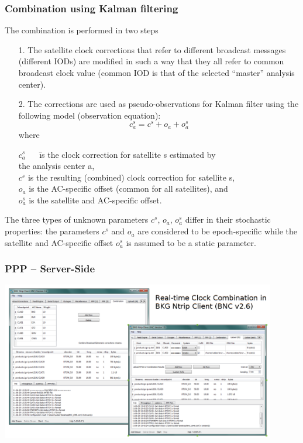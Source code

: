\documentclass[10pt]{beamer}
\begin{document}
\begin{frame}
  \frametitle{Combination using Kalman filtering}
  The combination is performed in two steps
  \begin{itemize}
  \item[1.] The satellite clock corrections that refer to different broadcast
    messages (different IODs) are modified in such a way that they all refer
    to common broadcast clock value (common IOD is that of the selected
    ``master'' analysis center).
  \item[2.] The corrections are used as pseudo-observations for Kalman filter
    using the following model (observation equation):
    \begin{displaymath}
    c_a^s = c^s + o_a + o_a^s
    \end{displaymath}
    where
    \begin{tabbing}
    $c_a^s$ ~~ \= is the clock correction for satellite s estimated by \\
               \> the analysis center a, \\
    $c^s$      \> is the resulting (combined) clock correction for 
                  satellite s, \\
    $o_a$      \> is the AC-specific offset 
                  (common for all satellites), and \\
    $o_a^s$      \> is the satellite and AC-specific offset.
    \end{tabbing}
  \end{itemize}
  The three types of unknown parameters $c^s$, $o_a$, $o_a^s$ differ in their
  stochastic properties: the parameters $c^s$ and $o_a$ are considered to be
  epoch-specific while the satellite and AC-specific offset $o_a^s$ is assumed
  to be a static parameter.
\end{frame}


\begin{frame}
\frametitle{PPP -- Server-Side}
  \begin{center}
    \includegraphics[width=0.9\textwidth,angle=0]{combination_1.png}
  \end{center}
\end{frame}
\end{document}
